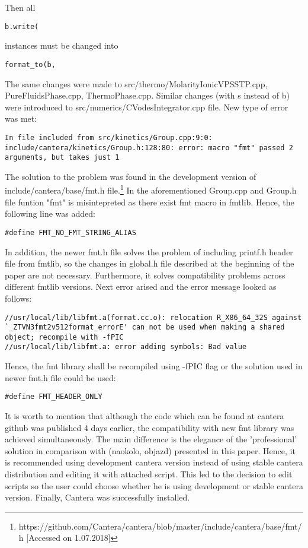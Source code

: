 \documentclass[12pt,english]{article}
\begin{document}
Then all 
\begin{lstlisting}
b.write(
\end{lstlisting} 
instances must be changed into 
\begin{lstlisting}
format_to(b,
\end{lstlisting} 
The same changes were made to src/thermo/MolarityIonicVPSSTP.cpp, PureFluidsPhase.cpp, ThermoPhase.cpp. Similar changes (with s instead of b) were introduced to src/numerics/CVodesIntegrator.cpp file.
New type of error was met:
\begin{lstlisting}
In file included from src/kinetics/Group.cpp:9:0:
include/cantera/kinetics/Group.h:128:80: error: macro "fmt" passed 2 arguments, but takes just 1
\end{lstlisting}
The solution to the problem was found in the development version of include/cantera/base/fmt.h file.\footnote{https://github.com/Cantera/cantera/blob/master/include/cantera/base/fmt/h [Accessed on 1.07.2018]} In the aforementioned Group.cpp and Group.h file funtion "fmt" is misintepreted as there exist fmt macro in fmtlib. Hence, the following line was added:
\begin{lstlisting}
#define FMT_NO_FMT_STRING_ALIAS
\end{lstlisting}
In addition, the newer fmt.h file solves the problem of including printf.h header file from fmtlib, so the changes in global.h file described at the beginning of the paper are not necessary. Furthermore, it solves compatibility problems across different fmtlib versions.
Next error arised and the error message looked as follows:
\begin{lstlisting}
//usr/local/lib/libfmt.a(format.cc.o): relocation R_X86_64_32S against `_ZTVN3fmt2v512format_errorE' can not be used when making a shared object; recompile with -fPIC
//usr/local/lib/libfmt.a: error adding symbols: Bad value
\end{lstlisting}
Hence, the fmt library shall be recompiled using -fPIC flag or the solution used in newer fmt.h file could be used:
\begin{lstlisting}
#define FMT_HEADER_ONLY
\end{lstlisting}
It is worth to mention that although the code which can be found at cantera github was published 4 days earlier, the compatibility with new fmt library was achieved simultaneously. The main difference is the elegance of the 'professional' solution in comparison with (naokolo, objazd) presented in this paper. Hence, it is recommended using development cantera version instead of using stable cantera distribution and editing it with attached script. This led to the decision to edit scripts so the user could choose whether he is using development or stable cantera version. Finally, Cantera was successfully installed.
\end{document}
